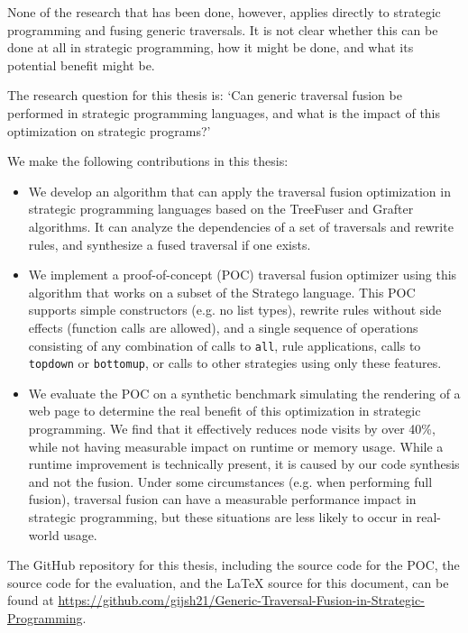 None of the research that has been done, however, applies directly to strategic programming and fusing generic traversals. It is not clear whether this can be done at all in strategic programming, how it might be done, and what its potential benefit might be.

The research question for this thesis is: `Can generic traversal fusion be performed in strategic programming languages, and what is the impact of this optimization on strategic programs?'

We make the following contributions in this thesis:
\begin{itemize}
    \item We develop an algorithm that can apply the traversal fusion optimization in strategic programming languages based on the TreeFuser and Grafter algorithms\cite{SakkaS017, SakkaSN019}. It can analyze the dependencies of a set of traversals and rewrite rules, and synthesize a fused traversal if one exists.
    \item We implement a proof-of-concept (POC) traversal fusion optimizer using this algorithm that works on a subset of the Stratego language. This POC supports simple constructors (e.g. no list types), rewrite rules without side effects (function calls are allowed), and a single sequence of operations consisting of any combination of calls to \texttt{all}, rule applications, calls to \texttt{topdown} or \texttt{bottomup}, or calls to other strategies using only these features.
    \item We evaluate the POC on a synthetic benchmark simulating the rendering of a web page to determine the real benefit of this optimization in strategic programming. We find that it effectively reduces node visits by over 40\%, while not having measurable impact on runtime or memory usage. While a runtime improvement is technically present, it is caused by our code synthesis and not the fusion. Under some circumstances (e.g. when performing full fusion), traversal fusion can have a measurable performance impact in strategic programming, but these situations are less likely to occur in real-world usage.
\end{itemize}

The GitHub repository for this thesis, including the source code for the POC, the source code for the evaluation, and the \LaTeX\; source for this document, can be found at \url{https://github.com/gijsh21/Generic-Traversal-Fusion-in-Strategic-Programming}.